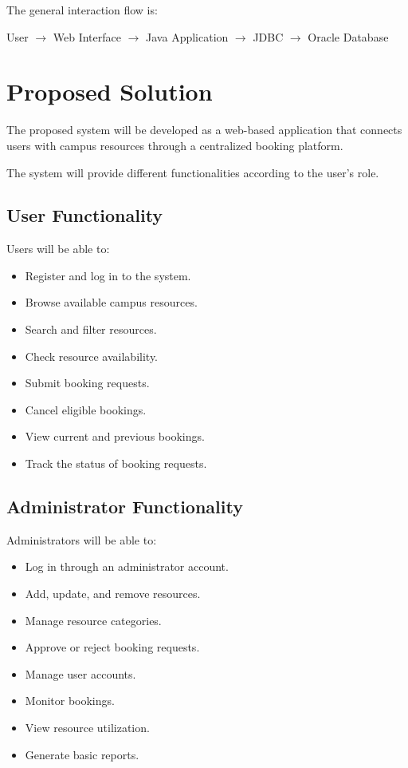 \documentclass[12pt,a4paper]{article}
\begin{document}
The general interaction flow is:

\begin{center}
User
$\rightarrow$
Web Interface
$\rightarrow$
Java Application
$\rightarrow$
JDBC
$\rightarrow$
Oracle Database
\end{center}

\section{Proposed Solution}

The proposed system will be developed as a web-based application that connects users with campus resources through a centralized booking platform.

The system will provide different functionalities according to the user's role.

\subsection{User Functionality}

Users will be able to:

\begin{itemize}
    \item Register and log in to the system.
    \item Browse available campus resources.
    \item Search and filter resources.
    \item Check resource availability.
    \item Submit booking requests.
    \item Cancel eligible bookings.
    \item View current and previous bookings.
    \item Track the status of booking requests.
\end{itemize}


\subsection{Administrator Functionality}

Administrators will be able to:

\begin{itemize}
    \item Log in through an administrator account.
    \item Add, update, and remove resources.
    \item Manage resource categories.
    \item Approve or reject booking requests.
    \item Manage user accounts.
    \item Monitor bookings.
    \item View resource utilization.
    \item Generate basic reports.
\end{itemize}
\end{document}
